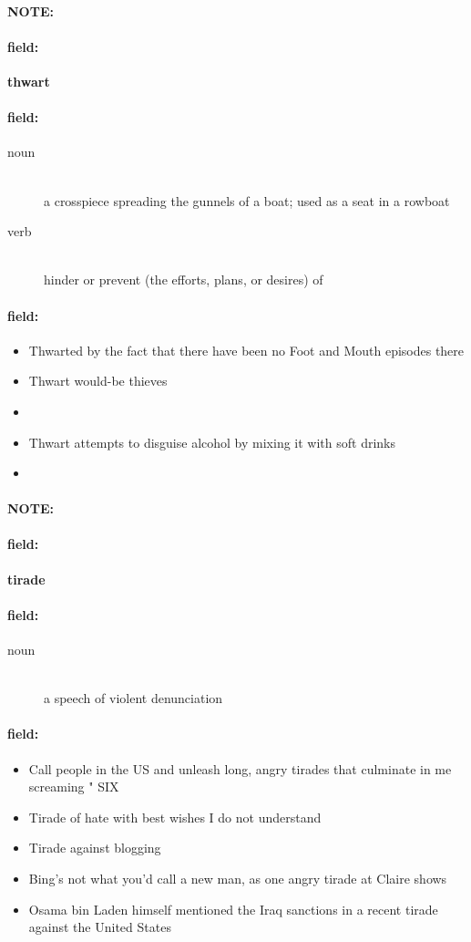 \documentclass[12pt]{article}
\newenvironment{note}{\paragraph{NOTE:}}{}
\newenvironment{field}{\paragraph{field:}}{}
\begin{document}
\begin{note}
\begin{field}
\textbf{\large thwart}
\end{field}


\begin{field}
\begin{description}
\item[noun] \hfill \\ 
a crosspiece spreading the gunnels of a boat; used as a seat in a rowboat

\item[verb] \hfill \\ 
hinder or prevent (the efforts, plans, or desires) of

\end{description}
\end{field}

\begin{field}
\begin{itemize}
\item Thwarted by the fact that there have been no Foot and Mouth episodes there
\item Thwart would-be thieves
\item 
\item Thwart attempts to disguise alcohol by mixing it with soft drinks
\item  
\end{itemize}
\end{field}
\end{note}
\begin{note}
\begin{field}
\textbf{\large tirade}
\end{field}


\begin{field}
\begin{description}
\item[noun] \hfill \\ 
a speech of violent denunciation

\end{description}
\end{field}

\begin{field}
\begin{itemize}
\item Call people in the US and unleash long, angry tirades that culminate in me screaming " SIX
\item Tirade of hate with best wishes I do not understand
\item Tirade against blogging
\item Bing's not what you'd call a new man, as one angry tirade at Claire shows
\item Osama bin Laden himself mentioned the Iraq sanctions in a recent tirade against the United States
\end{itemize}
\end{field}
\end{note}
\end{document}
